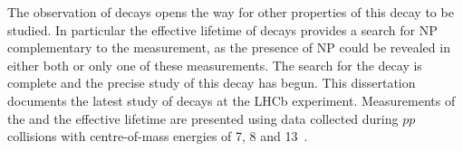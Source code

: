 The observation of \bsmumu decays opens the way for other properties of this decay to be studied. In particular the effective lifetime of \bsmumu decays provides a search for NP complementary to the \BF measurement, as the presence of NP could be revealed in either both or only one of these measurements. The search for the \bsmumu decay is complete and the precise study of this decay has begun.
This dissertation documents the latest study of \bmumu decays at the LHCb experiment. Measurements of the \bmumu \BFs and the \bsmumu effective lifetime are presented using data collected during $pp$ collisions with centre-of-mass energies of 7, 8 and 13~\tev. %

